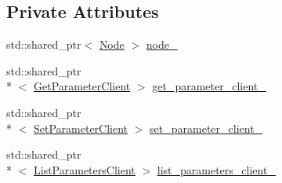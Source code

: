 \subsection*{Private Attributes}
\begin{DoxyCompactItemize}
\item 
std\-::shared\-\_\-ptr$<$ \hyperlink{classapollo_1_1cyber_1_1Node}{Node} $>$ \hyperlink{classapollo_1_1cyber_1_1ParameterClient_af5b1cc3adbe4ac895b0a208156a233b9}{node\-\_\-}
\item 
std\-::shared\-\_\-ptr\\*
$<$ \hyperlink{classapollo_1_1cyber_1_1ParameterClient_a8ec0154a2d14d3852069716a4b553c5f}{Get\-Parameter\-Client} $>$ \hyperlink{classapollo_1_1cyber_1_1ParameterClient_a465bd69389ab52ec3712ac9ec0e8597b}{get\-\_\-parameter\-\_\-client\-\_\-}
\item 
std\-::shared\-\_\-ptr\\*
$<$ \hyperlink{classapollo_1_1cyber_1_1ParameterClient_a2148326d395df8bc05fa03e1c92ad8fc}{Set\-Parameter\-Client} $>$ \hyperlink{classapollo_1_1cyber_1_1ParameterClient_a7c2d404d40870ee96fe51ca736ca8dd0}{set\-\_\-parameter\-\_\-client\-\_\-}
\item 
std\-::shared\-\_\-ptr\\*
$<$ \hyperlink{classapollo_1_1cyber_1_1ParameterClient_a5a6fef80c4ea818e6380dd49fe4843e9}{List\-Parameters\-Client} $>$ \hyperlink{classapollo_1_1cyber_1_1ParameterClient_ad8aa89ded98dc6f21245cf6145ba6888}{list\-\_\-parameters\-\_\-client\-\_\-}
\end{DoxyCompactItemize}


